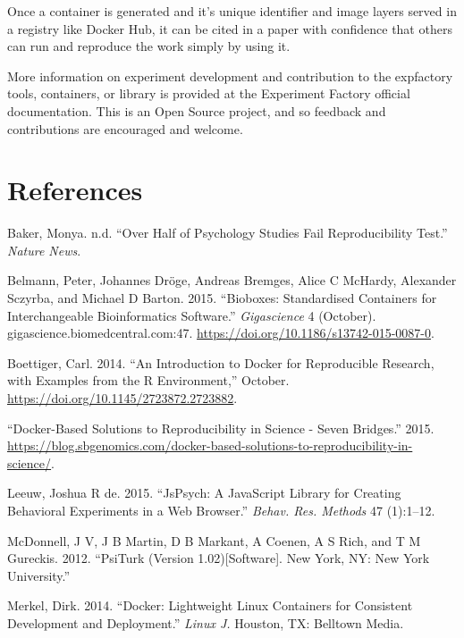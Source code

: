 \documentclass[10pt,a4paper,onecolumn]{article}
\begin{document}
Once a container is generated and it's unique identifier and image
layers served in a registry like Docker Hub, it can be cited in a paper
with confidence that others can run and reproduce the work simply by
using it.

More information on experiment development and contribution to the
expfactory tools, containers, or library is provided at the Experiment
Factory official documentation. This is an Open Source project, and so
feedback and contributions are encouraged and welcome.

\hypertarget{references}{%
\section*{References}\label{references}}

\hypertarget{refs}{}
\leavevmode\hypertarget{ref-Baker_undated-bx}{}%
Baker, Monya. n.d. ``Over Half of Psychology Studies Fail
Reproducibility Test.'' \emph{Nature News}.

\leavevmode\hypertarget{ref-Belmann2015-eb}{}%
Belmann, Peter, Johannes Dröge, Andreas Bremges, Alice C McHardy,
Alexander Sczyrba, and Michael D Barton. 2015. ``Bioboxes: Standardised
Containers for Interchangeable Bioinformatics Software.''
\emph{Gigascience} 4 (October). gigascience.biomedcentral.com:47.
\url{https://doi.org/10.1186/s13742-015-0087-0}.

\leavevmode\hypertarget{ref-Boettiger2014-cz}{}%
Boettiger, Carl. 2014. ``An Introduction to Docker for Reproducible
Research, with Examples from the R Environment,'' October.
\url{https://doi.org/10.1145/2723872.2723882}.

\leavevmode\hypertarget{ref-noauthor_2015-ig}{}%
``Docker-Based Solutions to Reproducibility in Science - Seven
Bridges.'' 2015.
\url{https://blog.sbgenomics.com/docker-based-solutions-to-reproducibility-in-science/}.

\leavevmode\hypertarget{ref-De_Leeuw2015-zw}{}%
Leeuw, Joshua R de. 2015. ``JsPsych: A JavaScript Library for Creating
Behavioral Experiments in a Web Browser.'' \emph{Behav. Res. Methods} 47
(1):1--12.

\leavevmode\hypertarget{ref-McDonnell2012-ns}{}%
McDonnell, J V, J B Martin, D B Markant, A Coenen, A S Rich, and T M
Gureckis. 2012. ``PsiTurk (Version 1.02){[}Software{]}. New York, NY:
New York University.''

\leavevmode\hypertarget{ref-Merkel2014-da}{}%
Merkel, Dirk. 2014. ``Docker: Lightweight Linux Containers for
Consistent Development and Deployment.'' \emph{Linux J.} Houston, TX:
Belltown Media.
\end{document}

